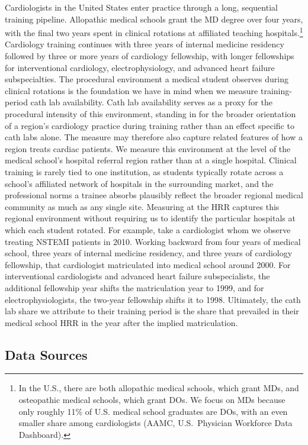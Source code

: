 \documentclass[12pt]{article}
\begin{document}
Cardiologists in the United States enter practice through a long, sequential training pipeline. Allopathic medical schools grant the MD degree over four years, with the final two years spent in clinical rotations at affiliated teaching hospitals.\footnote{In the U.S., there are both allopathic medical schools, which grant MDs, and osteopathic medical schools, which grant DOs. We focus on MDs because only roughly 11\% of U.S. medical school graduates are DOs, with an even smaller share among cardiologists (AAMC, U.S.\ Physician Workforce Data Dashboard).} Cardiology training continues with three years of internal medicine residency followed by three or more years of cardiology fellowship, with longer fellowships for interventional cardiology, electrophysiology, and advanced heart failure subspecialties. The procedural environment a medical student observes during clinical rotations is the foundation we have in mind when we measure training-period cath lab availability. Cath lab availability serves as a proxy for the procedural intensity of this environment, standing in for the broader orientation of a region's cardiology practice during training rather than an effect specific to cath labs alone. The measure may therefore also capture related features of how a region treats cardiac patients. We measure this environment at the level of the medical school's hospital referral region rather than at a single hospital. Clinical training is rarely tied to one institution, as students typically rotate across a school's affiliated network of hospitals in the surrounding market, and the professional norms a trainee absorbs plausibly reflect the broader regional medical community as much as any single site. Measuring at the HRR captures this regional environment without requiring us to identify the particular hospitals at which each student rotated. For example, take a cardiologist whom we observe treating NSTEMI patients in 2010. Working backward from four years of medical school, three years of internal medicine residency, and three years of cardiology fellowship, that cardiologist matriculated into medical school around 2000. For interventional cardiologists and advanced heart failure subspecialists, the additional fellowship year shifts the matriculation year to 1999, and for electrophysiologists, the two-year fellowship shifts it to 1998. Ultimately, the cath lab share we attribute to their training period is the share that prevailed in their medical school HRR in the year after the implied matriculation.

\subsection{Data Sources}
\end{document}
